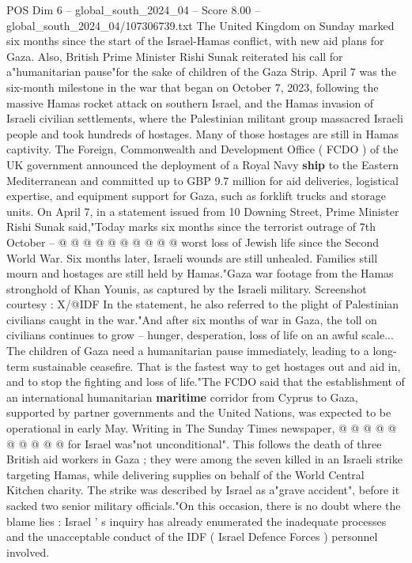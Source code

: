 \begin{textsample}{POS Dim 6 – global\_south\_2024\_04 – Score 8.00 – global\_south\_2024\_04/107306739.txt}  \label{ex:f6_pos_125}
The United Kingdom on Sunday marked six months since the start of the Israel-Hamas conflict, with new aid plans for Gaza.
Also, British Prime Minister Rishi Sunak reiterated his call for a"humanitarian pause"for the sake of children of the Gaza Strip.
April 7 was the six-month milestone in the war that began on October 7, 2023, following the massive Hamas rocket attack on southern Israel, and the Hamas invasion of Israeli civilian settlements, where the Palestinian militant group massacred Israeli people and took hundreds of hostages.
Many of those hostages are still in Hamas captivity.
The Foreign, Commonwealth and Development Office ( FCDO ) of the UK government announced the deployment of a Royal Navy \textbf{ship} to the Eastern Mediterranean and committed up to GBP 9.7 million for aid deliveries, logistical expertise, and equipment support for Gaza, such as forklift trucks and storage units.
On April 7, in a statement issued from 10 Downing Street, Prime Minister Rishi Sunak said,"Today marks six months since the terrorist outrage of 7th October -- @ @ @ @ @ @ @ @ @ @ worst loss of Jewish life since the Second World War.
Six months later, Israeli wounds are still unhealed.
Families still mourn and hostages are still held by Hamas."Gaza war footage from the Hamas stronghold of Khan Younis, as captured by the Israeli military.
Screenshot courtesy : X/@IDF In the statement, he also referred to the plight of Palestinian civilians caught in the war."And after six months of war in Gaza, the toll on civilians continues to grow -- hunger, desperation, loss of life on an awful scale...
The children of Gaza need a humanitarian pause immediately, leading to a long-term sustainable ceasefire.
That is the fastest way to get hostages out and aid in, and to stop the fighting and loss of life."The FCDO said that the establishment of an international humanitarian \textbf{maritime} corridor from Cyprus to Gaza, supported by partner governments and the United Nations, was expected to be operational in early May.
Writing in The Sunday Times newspaper, @ @ @ @ @ @ @ @ @ @ for Israel was"not unconditional".
This follows the death of three British aid workers in Gaza ; they were among the seven killed in an Israeli strike targeting Hamas, while delivering supplies on behalf of the World Central Kitchen charity.
The strike was described by Israel as a"grave accident", before it sacked two senior military officials."On this occasion, there is no doubt where the blame lies : Israel ' s inquiry has already enumerated the inadequate processes and the unacceptable conduct of the IDF ( Israel Defence Forces ) personnel involved.

\end{textsample}
